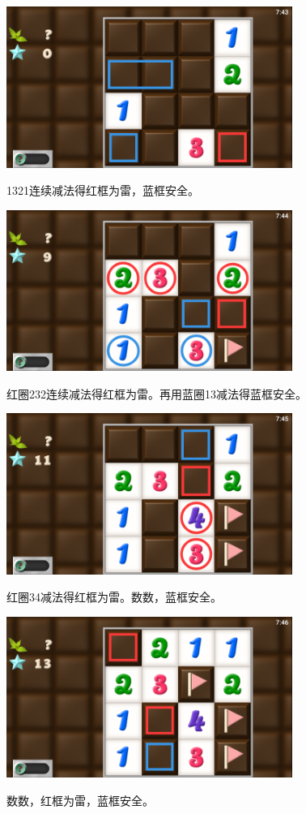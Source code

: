 \subsection{} %
\begin{center}
    \includegraphics[width=0.7\textwidth]{puzzle/46-1.png}
\end{center}
1321连续减法得红框为雷，蓝框安全。
\begin{center}
    \includegraphics[width=0.7\textwidth]{puzzle/46-2.png}
\end{center}
红圈232连续减法得红框为雷。再用蓝圈13减法得蓝框安全。
\begin{center}
    \includegraphics[width=0.7\textwidth]{puzzle/46-3.png}
\end{center}
红圈34减法得红框为雷。数数，蓝框安全。
\begin{center}
    \includegraphics[width=0.7\textwidth]{puzzle/46-4.png}
\end{center}
数数，红框为雷，蓝框安全。

